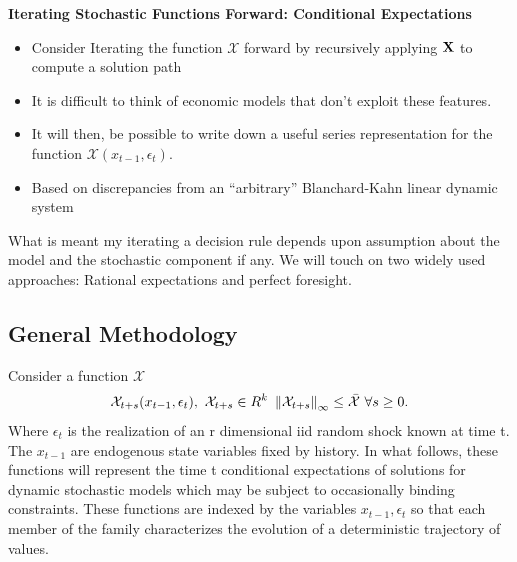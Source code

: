\documentclass[12pt]{article}
\begin{document}
 {\bf Iterating Stochastic Functions Forward: Conditional Expectations}

 \begin{itemize}
\item Consider Iterating the function $\mathcal{X}$ forward by 
recursively applying $\mathbf{X}{}$ to compute a solution path
\item It is difficult to think of economic models  that don't exploit these features.

 \item It will then, be possible to write down a useful 
series representation for
the function $\mathcal{X}(x_{t-1},\epsilon_t)$.
\item Based on discrepancies from an ``arbitrary'' Blanchard-Kahn linear dynamic system
 \end{itemize}




What is meant my iterating a decision rule depends upon assumption about the
model and the stochastic component if any.
We will  touch on two widely used approaches: Rational expectations and 
perfect foresight. 

\subsection{General Methodology}
\label{sec:general-methodology}



 Consider a function $\mathcal{X} $
 \begin{gather}
   \mathcal{X}_{t+s}(x_{t-1},\epsilon_t), \,\,\mathcal{X}_{t+s} \in{R^k}\,\,\left\lVert\mathcal{X}_{t+s}\right\rVert_\infty  \le \bar{\mathcal{X}}\,\,\forall s\ge 0 \label{fFamily}.
 \end{gather}
Where $\epsilon_t$ is the realization of an r dimensional iid random shock  known at time t. The $x_{t-1}$ are endogenous state variables fixed by history.  
In what follows, these functions will represent the time t conditional expectations of solutions for dynamic stochastic models which may be subject to occasionally binding constraints.  These functions are indexed by the variables $x_{t-1}, \epsilon_t$ so that each member of the family characterizes the evolution of a deterministic trajectory of values.
\end{document}
